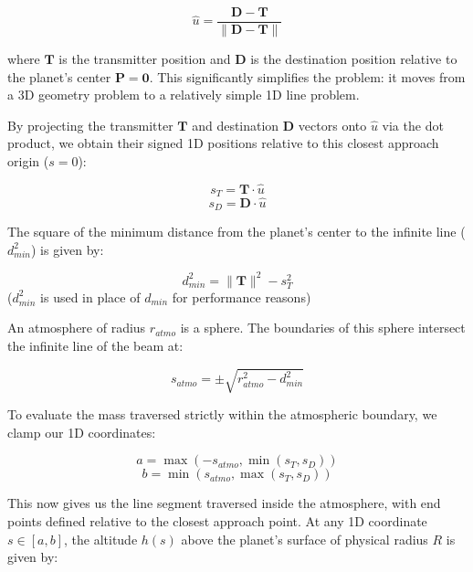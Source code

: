 ﻿\documentclass[12pt,a4paper]{article}
\begin{document}
\begin{equation}
\hat{u} = \frac{\mathbf{D} - \mathbf{T}}{\|\mathbf{D} - \mathbf{T}\|}
\end{equation}

where $\mathbf{T}$ is the transmitter position and $\mathbf{D}$ is the destination position relative to the planet's center $\mathbf{P} = \mathbf{0}$. This significantly simplifies the problem: it moves from a 3D geometry problem to a relatively simple 1D line problem.

By projecting the transmitter $\mathbf{T}$ and destination $\mathbf{D}$ vectors onto $\hat{u}$ via the dot product, we obtain their signed 1D positions relative to this closest approach origin ($s=0$):

\begin{equation}
s_T = \mathbf{T} \cdot \hat{u}
\end{equation}
\begin{equation}
s_D = \mathbf{D} \cdot \hat{u}
\end{equation}

The square of the minimum distance from the planet's center to the infinite line ($d_{min}^2$) is given by:

\begin{equation}
d_{min}^2 = \|\mathbf{T}\|^2 - s_T^2
\end{equation}
($d_{min}^2$ is used in place of $d_{min}$ for performance reasons)

An atmosphere of radius $r_{atmo}$ is a sphere. The boundaries of this sphere intersect the infinite line of the beam at:

\begin{equation}
s_{atmo} = \pm \sqrt{r_{atmo}^2 - d_{min}^2}
\end{equation}

To evaluate the mass traversed strictly within the atmospheric boundary, we clamp our 1D coordinates:

\begin{equation}
a = \max(-s_{atmo}, \min(s_T, s_D))
\end{equation}
\begin{equation}
b = \min(s_{atmo}, \max(s_T, s_D))
\end{equation}

This now gives us the line segment traversed inside the atmosphere, with end points defined relative to the closest approach point. At any 1D coordinate $s \in [a, b]$, the altitude $h(s)$ above the planet's surface of physical radius $R$ is given by:
\end{document}
